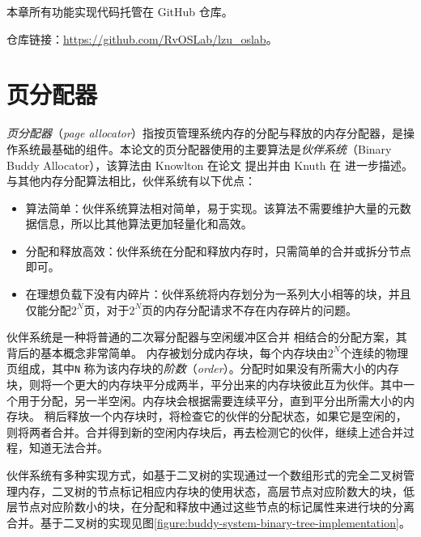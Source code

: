 \documentclass[AutoFakeBold]{LZUThesis}
\begin{document}
\begin{sloppypar}
本章所有功能实现代码托管在 GitHub 仓库。

仓库链接：\href{https://github.com/RvOSLab/lzu_oslab}{https://github.com/RvOSLab/lzu\_oslab}。

\chapter{页分配器}

\emph{页分配器}（\emph{page
allocator}）指按页管理系统内存的分配与释放的内存分配器，是操作系统最基础的组件。本论文的页分配器使用的主要算法是\emph{伙伴系统}（Binary
Buddy Allocator），该算法由 Knowlton 在论文{\cite{knowlton1965fast}} 提出并由 Knuth 在 {\cite{knuth1968art}} 进一步描述。与其他内存分配算法相比，伙伴系统有以下优点：

\begin{itemize}
\item
  算法简单：伙伴系统算法相对简单，易于实现。该算法不需要维护大量的元数据信息，所以比其他算法更加轻量化和高效。
\item
  分配和释放高效：伙伴系统在分配和释放内存时，只需简单的合并或拆分节点即可。
\item
  在理想负载下没有内碎片：伙伴系统将内存划分为一系列大小相等的块，并且仅能分配\(2^N\)页，对于\(2^N\)页的内存分配请求不存在内存碎片的问题。
\end{itemize}

伙伴系统是一种将普通的二次幂分配器与空闲缓冲区合并
相结合的分配方案，其背后的基本概念非常简单。
内存被划分成内存块，每个内存块由\(2^N\)个连续的物理页组成，其中\texttt{N}
称为该内存块的\emph{阶数}（\emph{order}）。分配时如果没有所需大小的内存块，则将一个更大的内存块平分成两半，平分出来的内存块彼此互为伙伴。其中一个用于分配，另一半空闲。内存块会根据需要连续平分，直到平分出所需大小的内存块。
稍后释放一个内存块时，将检查它的伙伴的分配状态，如果它是空闲的，则将两者合并。合并得到新的空闲内存块后，再去检测它的伙伴，继续上述合并过程，知道无法合并。

伙伴系统有多种实现方式，如基于二叉树的实现通过一个数组形式的完全二叉树管理内存，二叉树的节点标记相应内存块的使用状态，高层节点对应阶数大的块，低层节点对应阶数小的块，在分配和释放中通过这些节点的标记属性来进行块的分离合并。基于二叉树的实现见图\ref{figure:buddy-system-binary-tree-implementation}。


\end{sloppypar}
\end{document}
